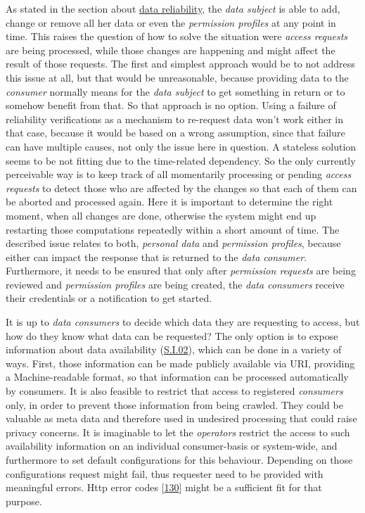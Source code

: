 \documentclass[12pt,english,a4paper,titlepage,cleardoublepage=empty,dottedtoc]{report}
\begin{document}
As stated in the section about \protect\hyperlink{data-reliability}{data
reliability}, the \emph{data subject} is able to add, change or remove
all her data or even the \emph{permission profiles} at any point in
time. This raises the question of how to solve the situation were
\emph{access requests} are being processed, while those changes are
happening and might affect the result of those requests. The first and
simplest approach would be to not address this issue at all, but that
would be unreasonable, because providing data to the \emph{consumer}
normally means for the \emph{data subject} to get something in return or
to somehow benefit from that. So that approach is no option. Using a
failure of reliability verifications as a mechanism to re-request data
won't work either in that case, because it would be based on a wrong
assumption, since that failure can have multiple causes, not only the
issue here in question. A stateless solution seems to be not fitting due
to the time-related dependency. So the only currently perceivable way is
to keep track of all momentarily processing or pending \emph{access
requests} to detect those who are affected by the changes so that each
of them can be aborted and processed again. Here it is important to
determine the right moment, when all changes are done, otherwise the
system might end up restarting those computations repeatedly within a
short amount of time. The described issue relates to both,
\emph{personal data} and \emph{permission profiles}, because either can
impact the response that is returned to the \emph{data consumer}.
Furthermore, it needs to be ensured that only after \emph{permission
requests} are being reviewed and \emph{permission profiles} are being
created, the \emph{data consumers} receive their credentials or a
notification to get started.

It is up to \emph{data consumers} to decide which data they are
requesting to access, but how do they know what data can be requested?
The only option is to expose information about data availability
(\protect\hyperlink{si02}{S.I.02}), which can be done in a variety of
ways. First, those information can be made publicly available via URI,
providing a Machine-readable format, so that information can be
processed automatically by consumers. It is also feasible to restrict
that access to registered \emph{consumers} only, in order to prevent
those information from being crawled. They could be valuable as meta
data and therefore used in undesired processing that could raise privacy
concerns. It is imaginable to let the \emph{operators} restrict the
access to such availability information on an individual consumer-basis
or system-wide, and furthermore to set default configurations for this
behaviour. Depending on those configurations request might fail, thus
requester need to be provided with meaningful errors. Http error codes
{[}\protect\hyperlink{ref-web_spec_http-error-codes}{130}{]} might be a
sufficient fit for that purpose.
\end{document}
